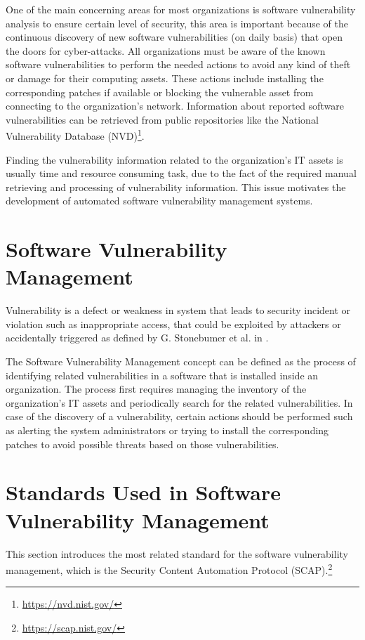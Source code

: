 \documentclass{llncs}
\begin{document}
\par One of the main concerning areas for most organizations is software vulnerability analysis to ensure certain level of security, this area is important because of the continuous discovery of new software vulnerabilities (on daily basis) that open the doors for cyber-attacks. All organizations must be aware of the known software vulnerabilities to perform the needed actions to avoid any kind of theft or damage for their computing assets. These actions include installing the corresponding patches if available or blocking the vulnerable asset from connecting to the organization's network. Information about reported software vulnerabilities can be retrieved from public repositories like the National Vulnerability Database (NVD)\footnote{\url{https://nvd.nist.gov/}}. 
\par Finding the vulnerability information related to the organization's IT assets is usually time and resource consuming task, due to the fact of the required manual retrieving and processing of vulnerability information. This issue motivates the development of automated software vulnerability management systems. 
 
       
\section{Software Vulnerability Management}

\par Vulnerability is a defect or weakness in system that leads to security incident or violation such as inappropriate access, that could be exploited by attackers or accidentally triggered as defined by G. Stonebumer et al. in \cite{vuln}.  

\par The Software Vulnerability Management concept can be defined as the process of identifying related vulnerabilities in a software that is installed inside an organization. The process first requires managing the inventory of the organization's IT assets and  periodically search for the related vulnerabilities. In case of the discovery of a vulnerability, certain actions should be performed such as alerting the system administrators or trying to install the corresponding patches to avoid possible threats based on those vulnerabilities. 


\section{Standards	Used	in	Software	Vulnerability	Management}
This section introduces the most related standard for the software vulnerability management, which is the Security Content Automation Protocol (SCAP).\footnote{\url{https://scap.nist.gov/}}
\end{document}
